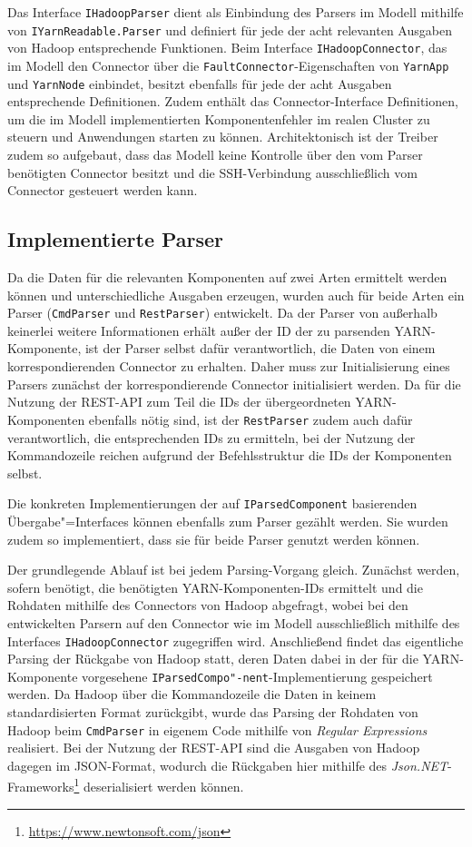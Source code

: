 Das Interface \texttt{IHadoopParser} dient als Einbindung des Parsers im Modell mithilfe von \texttt{IYarnReadable.Parser} und definiert für jede der acht relevanten Ausgaben von Hadoop entsprechende Funktionen. Beim Interface \texttt{IHadoopConnector}, das im Modell den Connector über die \texttt{FaultConnector}-Eigenschaften von \texttt{YarnApp} und \texttt{YarnNode} einbindet, besitzt ebenfalls für jede der acht Ausgaben entsprechende Definitionen. Zudem enthält das Connector-Interface Definitionen, um die im Modell implementierten Komponentenfehler im realen Cluster zu steuern und Anwendungen starten zu können. Architektonisch ist der Treiber zudem so aufgebaut, dass das Modell keine Kontrolle über den vom Parser benötigten Connector besitzt und die SSH-Verbindung ausschließlich vom Connector gesteuert werden kann.

\subsection{Implementierte Parser}\label{sec:implementedParsers}

Da die Daten für die relevanten Komponenten auf zwei Arten ermittelt werden können und unterschiedliche Ausgaben erzeugen, wurden auch für beide Arten ein Parser (\texttt{CmdParser} und \texttt{RestParser}) entwickelt. Da der Parser von außerhalb keinerlei weitere Informationen erhält außer der ID der zu parsenden YARN-Komponente, ist der Parser selbst dafür verantwortlich, die Daten von einem korrespondierenden Connector zu erhalten. Daher muss zur Initialisierung eines Parsers zunächst der korrespondierende Connector initialisiert werden. Da für die Nutzung der REST-API zum Teil die IDs der übergeordneten YARN-Komponenten ebenfalls nötig sind, ist der \texttt{RestParser} zudem auch dafür verantwortlich, die entsprechenden IDs zu ermitteln, bei der Nutzung der Kommandozeile reichen aufgrund der Befehlsstruktur die IDs der Komponenten selbst.

Die konkreten Implementierungen der auf \texttt{IParsedComponent} basierenden Übergabe"=Interfaces können ebenfalls zum Parser gezählt werden. Sie wurden zudem so implementiert, dass sie für beide Parser genutzt werden können.

Der grundlegende Ablauf ist bei jedem Parsing-Vorgang gleich. Zunächst werden, sofern benötigt, die benötigten YARN-Komponenten-IDs ermittelt und die Rohdaten mithilfe des Connectors von Hadoop abgefragt, wobei bei den entwickelten Parsern auf den Connector wie im Modell ausschließlich mithilfe des Interfaces \texttt{IHadoopConnector} zugegriffen wird. Anschließend findet das eigentliche Parsing der Rückgabe von Hadoop statt, deren Daten dabei in der für die YARN-Komponente vorgesehene \texttt{IParsedCompo"-nent}-Implementierung gespeichert werden. Da Hadoop über die Kommandozeile die Daten in keinem standardisierten Format zurückgibt, wurde das Parsing der Rohdaten von Hadoop beim \texttt{CmdParser} in eigenem Code mithilfe von \emph{Regular Expressions} realisiert. Bei der Nutzung der REST-API sind die Ausgaben von Hadoop dagegen im JSON-Format, wodurch die Rückgaben hier mithilfe des \emph{Json.NET}-Frameworks\footnote{\url{https://www.newtonsoft.com/json}} deserialisiert werden können.

